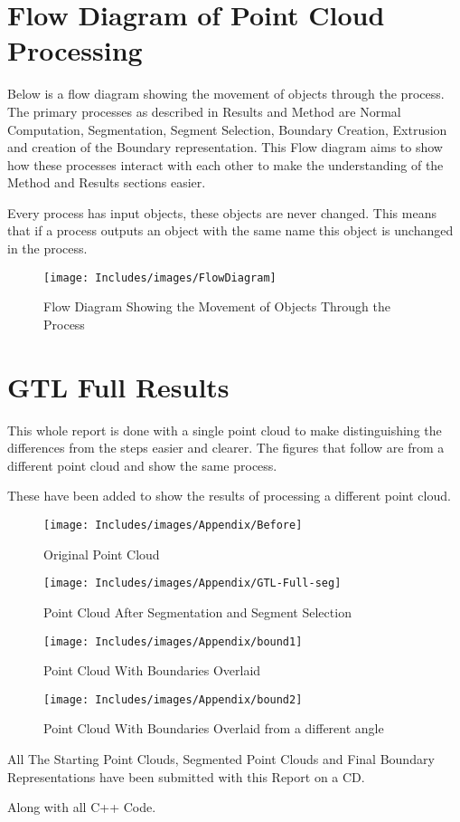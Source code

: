 \appendix
\chapter{Flow Diagram of Point Cloud Processing}
Below is a flow diagram showing the movement of objects through the process. The primary processes as described in Results and Method are Normal Computation, Segmentation, Segment Selection, Boundary Creation, Extrusion and creation of the Boundary representation. This Flow diagram aims to show how these processes interact with each other to make the understanding of the Method and Results sections easier.

Every process has input objects, these objects are never changed. This means that if a process outputs an object with the same name this object is unchanged in the process.

\begin{figure}[p]
\centering
\texttt{[image: Includes/images/FlowDiagram]}
\caption{Flow Diagram Showing the Movement of Objects Through the Process}
\label{fig:FlowDiagram}
\end{figure}



\chapter{GTL Full Results}
\label{GTL Results}
This whole report is done with a single point cloud to make distinguishing the differences from the steps easier and clearer. The figures that follow are from a different point cloud and show the same process.

These have been added to show the results of processing a different point cloud.

\begin{figure}[H]
\centering
\texttt{[image: Includes/images/Appendix/Before]}
\caption{Original Point Cloud}
\label{fig:Before}
\end{figure}

\begin{figure}[H]
\centering
\texttt{[image: Includes/images/Appendix/GTL-Full-seg]}
\caption{Point Cloud After Segmentation and Segment Selection}
\label{fig:GTL-Full-seg}
\end{figure}

\begin{figure}[H]
\centering
\texttt{[image: Includes/images/Appendix/bound1]}
\caption{Point Cloud With Boundaries Overlaid}
\label{fig:bound1}
\end{figure}
\begin{figure}[H]
\centering
\texttt{[image: Includes/images/Appendix/bound2]}
\caption{Point Cloud With Boundaries Overlaid from a different angle}
\label{fig:bound2}
\end{figure}

All The Starting Point Clouds, Segmented Point Clouds and Final Boundary Representations have been submitted with this Report on a CD.

Along with all C++ Code.


